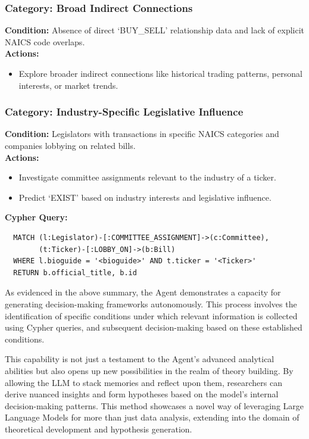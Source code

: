 \documentclass[15pt,letterpaper]{article}
\begin{document}
\begin{mdframed}
  \subsubsection*{Category: Broad Indirect Connections}
  \textbf{Condition:} Absence of direct `BUY\_SELL' relationship data and lack of explicit NAICS code overlaps.
  \\ \textbf{Actions:}
  \begin{itemize}
      \item Explore broader indirect connections like historical trading patterns, personal interests, or market trends.
  \end{itemize}
  
  \subsubsection*{Category: Industry-Specific Legislative Influence}
  \textbf{Condition:} Legislators with transactions in specific NAICS categories and companies lobbying on related bills.
  \\\textbf{Actions:}
  \begin{itemize}
      \item Investigate committee assignments relevant to the industry of a ticker.
      \item Predict `EXIST' based on industry interests and legislative influence.
  \end{itemize}
  \textbf{Cypher Query:} 
  \begin{verbatim}
  MATCH (l:Legislator)-[:COMMITTEE_ASSIGNMENT]->(c:Committee), 
        (t:Ticker)-[:LOBBY_ON]->(b:Bill)
  WHERE l.bioguide = '<bioguide>' AND t.ticker = '<Ticker>' 
  RETURN b.official_title, b.id
  \end{verbatim}
  
  \end{mdframed}

  \vspace{5mm} %

  As evidenced in the above summary, the Agent demonstrates a capacity for generating decision-making frameworks autonomously. This process involves the identification of specific conditions under which relevant information is collected using Cypher queries, and subsequent decision-making based on these established conditions.
  
  This capability is not just a testament to the Agent's advanced analytical abilities but also opens up new possibilities in the realm of theory building. By allowing the LLM to stack memories and reflect upon them, researchers can derive nuanced insights and form hypotheses based on the model's internal decision-making patterns. This method showcases a novel way of leveraging Large Language Models for more than just data analysis, extending into the domain of theoretical development and hypothesis generation.
  
\end{document}

